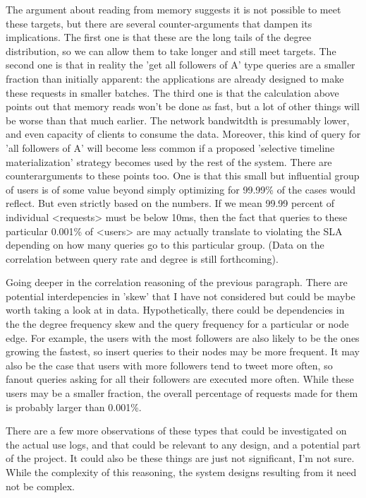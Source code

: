 \documentclass[draft]{article}
\begin{document}
 The argument about reading from memory suggests it is not possible to meet these targets, but there are several counter-arguments that dampen its implications. The first one is that these are the long tails of the degree distribution, so we can allow them to take longer and still meet targets.  The second one is that in reality the 'get all followers of A'  type queries are a smaller fraction than initially apparent: the applications are already designed to make these requests in smaller batches. The third one is that the calculation above points out that memory reads won't be done as fast, but a lot of other things will be worse than that much earlier. The network bandwitdth is presumably lower, and  even capacity of clients to consume the data. Moreover, this kind of query for 'all followers of A' will become less common if a proposed 'selective timeline materialization' strategy becomes used by the rest of the system. There are counterarguments to these points too. One is that this small but influential group of users is of some value beyond simply optimizing for 99.99\% of the cases would reflect. But even strictly based on the numbers. If we mean 99.99 percent of individual <requests> must be below 10ms, then the fact that queries to these particular 0.001\% of <users> are may actually translate to violating the SLA depending on how many queries go to this particular group. (Data on the correlation between query rate and degree is still forthcoming).

Going deeper in the correlation reasoning of the previous paragraph. There are potential interdepencies in 'skew' that I have not considered but could be maybe worth taking a look at in data. Hypothetically, there could be dependencies in the the degree frequency skew and the query frequency for a particular or node edge. For example, the users with the most followers are also likely to be the ones growing the fastest, so insert queries to their nodes may be more frequent. It may also be the case that users with more followers tend to tweet more often, so fanout queries asking for all their followers are executed more often. While these users may be a smaller fraction, the overall percentage of requests made for them is probably larger than 0.001\%.  

There are a few more observations of these types that could be investigated on the actual use logs, and that could be relevant to any design, and a potential part of the project. It could also be these things are just not significant, I'm not sure. While the complexity of this reasoning, the system designs resulting from it need not be complex.
\end{document}
